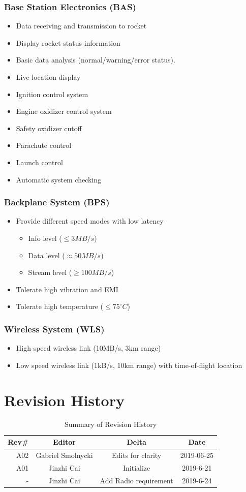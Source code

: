 \documentclass[12pt,article]{memoir}
\begin{document}
\subsection{Base Station Electronics (BAS)}
\begin{itemize}
\item Data receiving and transmission to rocket
\item Display rocket status information 
\item Basic data analysis (normal/warning/error status).
\item Live location display
\item Ignition control system
\item Engine oxidizer control system
\item Safety oxidizer cutoff
\item Parachute control
\item Launch control
\item Automatic system checking
\end{itemize}
\subsection{Backplane System (BPS)}
\begin{itemize}
\item Provide different speed modes with low latency
\begin{itemize}
\item Info level ($\leq 3MB/s$)
\item Data level ($\approx 50MB/s$)
\item Stream level ($\geq 100MB/s$)
\end{itemize}
\item Tolerate high vibration and EMI
\item Tolerate high temperature ($\leq 75^{\circ}C$)
\end{itemize}
\subsection{Wireless System (WLS)}
\begin{itemize}
\item High speed wireless link (10MB/s, 3km range)
\item Low speed wireless link (1kB/s, 10km range) with time-of-flight location
\end{itemize}
\chapter{Revision History}
\begin{table}[H]
	\centering
	\begin{tabu}{r || c | c | c }
		Rev\# & Editor & Delta & Date\\ \hline
		A02 & Gabriel Smolnycki & Edits for clarity & 2019-06-25\\ \hline
		A01 & Jinzhi Cai & Initialize  & 2019-6-21 \\
		-	& Jinzhi Cai & Add Radio requirement & 2019-6-24
	\end{tabu}
	\caption{Summary of Revision History}
	\label{tab:edatools}
\end{table}

\end{document}
